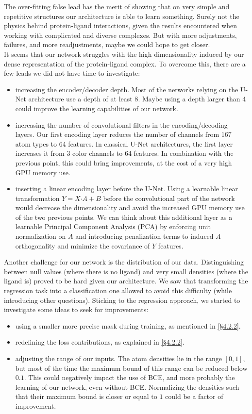 \documentclass{article}
\begin{document}
The over-fitting false lead has the merit of showing that on very simple and repetitive structures our architecture is able to learn something. Surely not the physics behind protein-ligand interactions, given the results encountered when working with complicated and diverse complexes. But with more adjustments, failures, and more readjustments, maybe we could hope to get closer. \\
It seems that our network struggles with the high dimensionality induced by our dense representation of the protein-ligand complex. To overcome this, there are a few leads we did not have time to investigate:
\begin{itemize}
    \item increasing the encoder/decoder depth. Most of the networks relying on the U-Net architecture use a depth of at least 8. Maybe using a depth larger than 4 could improve the learning capabilities of our network.
    \item increasing the number of convolutional filters in the encoding/decoding layers. Our first encoding layer reduces the number of channels from 167 atom types to 64 features. In classical U-Net architectures, the first layer increases it from 3 color channels to 64 features. In combination with the previous point, this could bring improvements, at the cost of a very high GPU memory use.
    \item inserting a linear encoding layer before the U-Net. Using a learnable linear transformation $Y = X \boldsymbol{\cdot} A + B$ before the convolutional part of the network would decrease the dimensionality and avoid the increased GPU memory use of the two previous points. We can think about this additional layer as a learnable Principal Component Analysis (PCA) by enforcing unit normalization on $A$ and introducing penalization terms to induced $A$ orthogonality and minimize the covariance of $Y$ features.
\end{itemize}
Another challenge for our network is the distribution of our data. Distinguishing between null values (where there is no ligand) and very small densities (where the ligand is) proved to be hard given our architecture. We saw that transforming the regression task into a classification one allowed to avoid this difficulty (while introducing other questions). Sticking to the regression approach, we started to investigate some ideas to seek for improvements:
\begin{itemize}
    \item using a smaller more precise mask during training, as mentioned in \hyperref[sec:res-reality]{[\S4.2.2]}.
    \item redefining the loss contributions, as explained in \hyperref[sec:res-reality]{[\S4.2.2]}.
    \item adjusting the range of our inputs. The atom densities lie in the range $[0,1]$, but most of the time the maximum bound of this range can be reduced below $0.1$. This could negatively impact the use of BCE, and more probably the learning of our network, even without BCE. Normalizing the densities such that their maximum bound is closer or equal to $1$ could be a factor of improvement.
\end{itemize}
\end{document}
